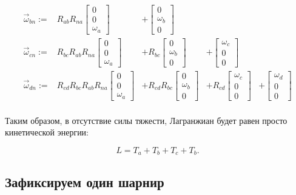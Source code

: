 \documentclass{article}
\begin{document}
$$
\begin{array}{rrrrl}
\vec \omega_{bn}  := &             R_{ab}R_{na}\begin{bmatrix}0\\0\\\omega_a\end{bmatrix} &+             \begin{bmatrix}0\\\omega_b\\0\end{bmatrix} & &\\
\vec \omega_{cn}  := &       R_{bc}R_{ab}R_{na}\begin{bmatrix}0\\0\\\omega_a\end{bmatrix} &+       R_{bc}\begin{bmatrix}0\\\omega_b\\0\end{bmatrix} &+ \begin{bmatrix}\omega_c\\0\\0\end{bmatrix}&\\
\vec \omega_{dn}  := & R_{cd}R_{bc}R_{ab}R_{na}\begin{bmatrix}0\\0\\\omega_a\end{bmatrix} &+ R_{cd}R_{bc}\begin{bmatrix}0\\\omega_b\\0\end{bmatrix} &+ R_{cd}\begin{bmatrix}\omega_c\\0\\0\end{bmatrix} &+ \begin{bmatrix}\omega_d\\0\\0\end{bmatrix}\\
\end{array}
$$

Таким образом, в отсутствие силы тяжести, Лагранжиан будет равен просто кинетической энергии:

$$
L = T_a + T_b + T_c + T_b.
$$

\subsection{Зафиксируем один шарнир}
\end{document}
